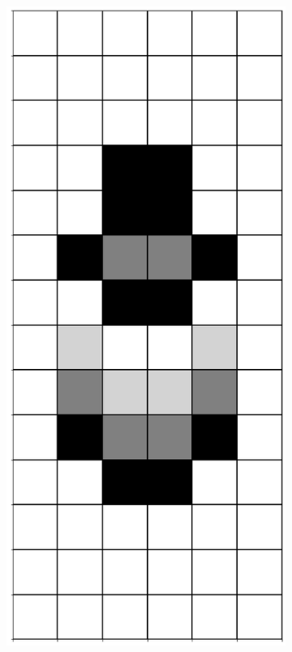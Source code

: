\documentclass[12pt]{article}
\numberwithin{figure}{section} %
\begin{document}
\begin{figure}[H]
\begin{subfigure}{0.18\textwidth}
     		\subcaption{}
   	\end{subfigure}
     	\begin{subfigure}{0.18\textwidth}
     		\centering
     		\includegraphics[width=\linewidth]{Section4/34.2}

\end{subfigure}
\end{figure}
\end{document}
